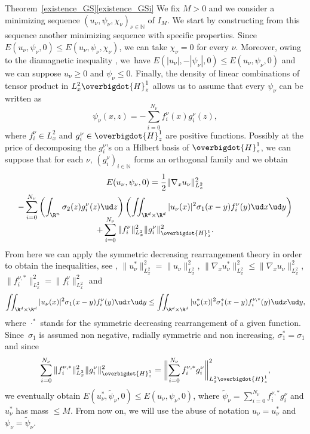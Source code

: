 \begin{ProofOf}{Theorem~\ref{existence_GS}\eqref{existence_GSi}}
We fix $M>0$ and we consider a minimizing sequence $(u_{\nu},\psi_{\nu},\chi_{\nu})_{\nu\in\mathbb N}$ of $I_{M}$. We start by constructing from this sequence another minimizing sequence with specific properties. Since $E(u_{\nu},\psi_{\nu},0)\leq E(u_{\nu},\psi_{\nu},\chi_{\nu})$, we can take $\chi_{\nu}=0$ for every $\nu$. Moreover, owing to
the diamagnetic inequality \cite[Th.\,7.21]{LL}, we~have
$E(|u_{\nu}|,-|\psi_{\nu}|,0)\leq E(u_{\nu},\psi_{\nu},0)$ and we can suppose $u_{\nu}\geq 0$ and $\psi_{\nu}\leq 0$. Finally, the density of linear combinations of tensor product in $L_{x}^{2}\overbigdot{H}_{z}^{1}$ allows us to assume that every $\psi_{\nu}$ can be written as\vspace*{-3pt}
\[
\psi_{\nu}(x,z)=-\sum\limits_{i=0}^{N_{\nu}}f_{i}^{\nu}(x)g_{i}^{\nu}(z),
\]
where $f_{i}^{\nu}\in L_{x}^{2}$ and $g_{i}^{\nu}\in\overbigdot{H}_{z}^{1}$ are positive functions.
Possibly at the price of decomposing the
$g_{i}^{\nu}$'s on a Hilbert basis of $\overbigdot{H}_{z}^{1}$, we can suppose that for each $\nu$, $(g_{i}^{\nu})_{i\in \mathbb N}$ forms an orthogonal family and we obtain\vspace*{-8pt}
\begin{multline*}
E(u_{\nu},\psi_{\nu},0)=\frac{1}{2}\|\nabla_{x}u_{\nu}\|_{L_{x}^{2}}^{2}\\
-\sum\limits_{i=0}^{N_{\nu}}\left(\int_{\R^{n}}\sigma_{2}(z)g_{i}^{\nu}(z)\ud z\right)\left(\iint_{\R^{d}\times\R^{d}}|u_{\nu}(x)|^{2}\sigma_{1}(x-y)f_{i}^{\nu}(y)\ud x\ud y\right)\\[
-8pt]
+\sum\limits_{i=0}^{N_{\nu}}\|f_{i}^{\nu}\|_{L_{x}^{2}}^{2}\|g_{i}^{\nu}\|_{\overbigdot{H}_{z}^{1}}^{2}.
\end{multline*}
From here we can apply the symmetric decreasing rearrangement theory in order to obtain the inequalities, see \cite[Chap.\,3]{LL}, $\|u_{\nu}^{*}\|_{L_{x}^{2}}^{2}=\|u_{\nu}\|_{L_{x}^{2}}^{2}$,
$\|\nabla_{x}u_{\nu}^{*}\|_{L_{x}^{2}}^{2}\leq\|\nabla_{x}u_{\nu}\|_{L_{x}^{2}}^{2}$, $\|f_{i}^{\nu,*}\|_{L_{x}^{2}}^{2}=\|f_{i}^{\nu}\|_{L_{x}^{2}}^{2}$ and\vspace*{-3pt}
\[
\iint_{\R^{d}\times\R^{d}}|u_{\nu}(x)|^{2}\sigma_{1}(x-y)f_{i}^{\nu}(y)\ud x\ud y\leq \iint_{\R^{d}\times\R^{d}}|u_{\nu}^{*}(x)|^{2}\sigma_{1}^{*}(x-y)f_{i}^{\nu,*}(y)\ud x\ud y,
\]
where $\cdot^{*}$ stands for the symmetric decreasing rearrangement of a given function. Since~$\sigma_{1}$ is assumed non negative, radially symmetric and non increasing, $\sigma_{1}^{*}=\sigma_{1}$ and since\vspace*{-5pt}
\[
\sum\limits_{i=0}^{N_{\nu}}\|f_{i}^{\nu,*}\|_{L_{x}^{2}}^{2}\|g_{i}^{\nu}\|_{\overbigdot{H}_{z}^{1}}^{2}=\biggl\|\sum\limits_{i=0}^{N_{\nu}}f_{i}^{\nu,*}g_{i}^{\nu}\biggr\|_{L_{x}^{2}\overbigdot{H}_{z}^{1}}^{2},
\]
we eventually obtain $E(u_{\nu}^{*},\widetilde{\psi}_{\nu},0)\leq E(u_{\nu},\psi_{\nu},0)$,
where $\widetilde{\psi}_{\nu}=\sum_{i=0}^{N_{\nu}}f_{i}^{\nu,*}g_{i}^{\nu}$
and $u_{\nu}^{*}$ has mass $\leq M$. From now on, we will use the abuse of notation $u_{\nu}=u_{\nu}^{*}$ and $\psi_{\nu}=\widetilde{\psi}_{\nu}$.


\end{ProofOf}
